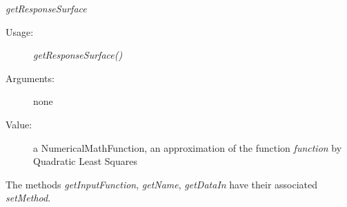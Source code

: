 \begin{description}
\begin{description}
\item \textit{getResponseSurface}
\begin{description}
\item[Usage:] \textit{getResponseSurface()} %
\item[Arguments:] none
\item[Value:] a NumericalMathFunction, an approximation of the function \textit{function} by Quadratic Least Squares
\end{description}

\end{description}

\item[Links:]\rule{0pt}{1em}
\end{description}

The methods \textit{getInputFunction}, \textit{getName}, \textit{getDataIn} have their associated \textit{setMethod}.

